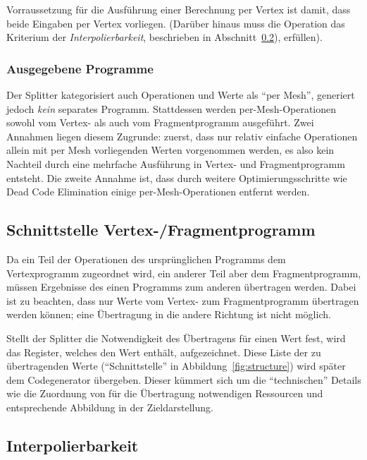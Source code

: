 \documentclass[twoside,a4paper,fleqn,12pt]{book}
\begin{document}
Vorraussetzung für die Ausführung einer Berechnung per Vertex ist damit, dass beide Eingaben per Vertex vorliegen.
(Darüber hinaus muss die Operation das Kriterium der \emph{Interpolierbarkeit}, beschrieben in Abschnitt~\ref{Interpolierbarkeit}), erfüllen).

\subsubsection{Ausgegebene Programme}
Der Splitter kategorisiert auch Operationen und Werte als "`per Mesh"', generiert jedoch \emph{kein} separates Programm.
Stattdessen werden per-Mesh-Operationen sowohl vom Vertex- als auch vom Fragmentprogramm ausgeführt. Zwei Annahmen
liegen diesem Zugrunde: zuerst, dass nur relativ einfache Operationen allein mit per Mesh vorliegenden Werten vorgenommen werden, es also kein
Nachteil durch eine mehrfache Ausführung in Vertex- und Fragmentprogramm entsteht. Die zweite Annahme ist,
dass durch weitere Optimierungsschritte wie Dead Code Elimination einige per-Mesh-Operationen entfernt werden.


\subsection{Schnittstelle Vertex-/Fragmentprogramm}
\label{schnittstelle}

Da ein Teil der Operationen des ursprünglichen Programms dem Vertexprogramm zugeordnet wird, ein anderer Teil aber dem
Fragmentprogramm, müssen Ergebnisse des einen Programms zum anderen übertragen werden.
Dabei ist zu beachten, dass nur Werte vom Vertex- zum Fragmentprogramm übertragen werden können; %
eine Übertragung in die andere Richtung ist nicht möglich.

Stellt der Splitter die Notwendigkeit des Übertragens für einen Wert fest, wird das Register, welches den Wert enthält, aufgezeichnet.
Diese Liste der zu übertragenden Werte ("`Schnittstelle"' in Abbildung~\ref{fig:structure}) wird später dem Codegenerator übergeben.
Dieser kümmert sich um die "`technischen"' Details wie die Zuordnung von für die Übertragung notwendigen Ressourcen und %
entsprechende Abbildung in der Zieldarstellung.

\subsection{Interpolierbarkeit}
\label{Interpolierbarkeit}
\end{document}
